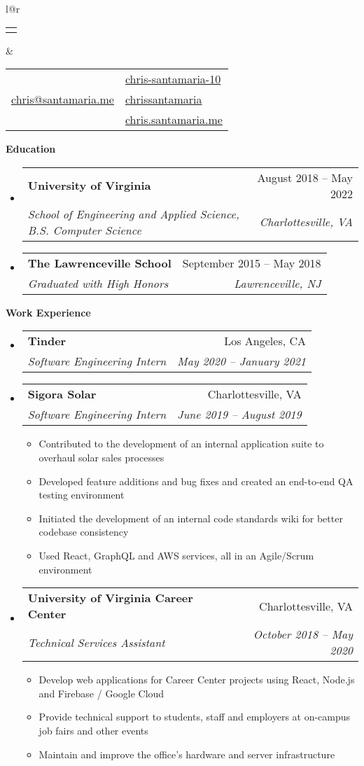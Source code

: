 \documentclass[letterpaper,12pt]{article}[leftmargin=*]
\makeatletter
\def \fullname {Chris Santamaria}
\def \linkedinicon {\faLinkedinSquare}
\def \linkedinlink {https://www.linkedin.com/in/chris-santamaria-10}
\def \linkedintext {chris-santamaria-10}
\def \phoneicon {\faPhone}
\def \phonetext {(813) 545-5164}
\def \emailicon {\faEnvelope}
\def \emaillink {mailto:chris@santamaria.me}
\def \emailtext {chris@santamaria.me}
\def \locationicon {\faMapMarker}
\def \locationtext {Saint Petersburg, FL}
\def \githubicon {\faGithub}
\def \githublink {https://github.com/chrissantamaria}
\def \githubtext {chrissantamaria}
\def \websiteicon {\faGlobe}
\def \websitelink {https://chris.santamaria.me}
\def \websitetext {chris.santamaria.me}
\def \headertype {\doublecol} %
\def \entryspacing {-0pt}
\def \linkedin {\linkedinicon \hspace{3pt}\href{\linkedinlink}{\linkedintext}}
\def \phone {\phoneicon \hspace{3pt}{ \phonetext}}
\def \email {\emailicon \hspace{4pt}\href{\emaillink}{\emailtext}}
\def \location {\hspace{0pt} \locationicon \hspace{2pt}{ \locationtext}}
\def \github {\githubicon \hspace{3pt}\href{\githublink}{\githubtext}}
\def \website {\websiteicon \hspace{3pt}\href{\websitelink}{\websitetext}}
\renewcommand{\section}[2]{\vspace{5pt}
  \colorbox{secondary}{\color{white}\raggedbottom\normalsize\textbf{{#1}{\hspace{7pt}#2}}}
}
\newcommand{\resumeEntryStart}{\begin{itemize}[leftmargin=2.5mm]}
\newcommand{\resumeEntryEnd}{\end{itemize}\vspace{\entryspacing}}
\newcommand{\resumeItemListStart}{\begin{itemize}[leftmargin=4.5mm]}
\newcommand{\resumeItemListEnd}{\end{itemize}}
\newcommand{\resumeItem}[1]{
  \item\small{
    {#1 \vspace{-2pt}}
  }
}
\newcommand{\resumeEntryTSDL}[4]{
  \vspace{-1pt}\item[]
    \begin{tabular*}{0.97\textwidth}{l@{\extracolsep{\fill}}r}
      \textbf{\color{primary}#1} & {\firabook\color{accent}\small#2} \\
      \textit{\color{accent}\small#3} & \textit{\color{accent}\small#4} \\
    \end{tabular*}\vspace{-7pt}
}
\newcommand{\doublecol}[6]{
  \begin{tabular*}{\textwidth}{l@{\extracolsep{\fill}}r}
    {
      \begin{tabular}[c]{l}
        \fontsize{35}{45}\selectfont{\color{primary}{{\textbf{\fullname}}}}
      \end{tabular}
    } & {
      \begin{tabular}[c]{l@{\hspace{1.5em}}l}
        {\small#4} & {\small#1} \\
        {\small#5} & {\small#2} \\
        {\small#6} & {\small#3}
      \end{tabular}
    }
  \end{tabular*}
}
\newcommand{\singlecol}[6]{
  \begin{tabular*}{\textwidth}{l@{\extracolsep{\fill}}r}
    {
      \begin{tabular}[b]{l}
        \fontsize{35}{45}\selectfont{\color{primary}{{\textbf{\fullname}}}} \\
        {\textit{\subtitle}} %
      \end{tabular}
    } & {
      \begin{tabular}[c]{l}
        {\small#1} \\
        {\small#2} \\
        {\small#3} \\
        {\small#4} \\
        {\small#5} \\
        {\small#6}
      \end{tabular}
    }
  \end{tabular*}
}
\makeatother
\begin{document}


\headertype{\linkedin}{\github}{\website}{\phone}{\email}{\location} %
\vspace{0pt} %

\section{\faGraduationCap}{Education}

  \resumeEntryStart
    \resumeEntryTSDL
      {University of Virginia}{August 2018 -- May 2022}
      {School of Engineering and Applied Science, B.S. Computer Science}{Charlottesville, VA}
  \resumeEntryEnd
  \resumeEntryStart
  \resumeEntryTSDL
    {The Lawrenceville School}{September 2015 -- May 2018}
    {Graduated with High Honors}{Lawrenceville, NJ}
  \resumeEntryEnd

\section{\faCode}{Work Experience}

  \resumeEntryStart
    \resumeEntryTSDL
      {Tinder}{Los Angeles, CA}
      {Software Engineering Intern}{May 2020 -- January 2021}
  \resumeEntryEnd

  \resumeEntryStart
    \resumeEntryTSDL
      {Sigora Solar}{Charlottesville, VA}
      {Software Engineering Intern}{June 2019 -- August 2019}
    \resumeItemListStart
      \resumeItem {Contributed to the development of an internal application suite to overhaul solar sales processes}
      \resumeItem {Developed feature additions and bug fixes and created an end-to-end QA testing environment}
      \resumeItem {Initiated the development of an internal code standards wiki for better codebase consistency}
      \resumeItem {Used React, GraphQL and AWS services, all in an Agile/Scrum environment}
    \resumeItemListEnd
  \resumeEntryEnd

  \resumeEntryStart
    \resumeEntryTSDL
      {University of Virginia Career Center}{Charlottesville, VA}
      {Technical Services Assistant}{October 2018 -- May 2020}
    \resumeItemListStart
      \resumeItem {Develop web applications for Career Center projects using React, Node.js and Firebase / Google Cloud}
      \resumeItem {Provide technical support to students, staff and employers at on-campus job fairs and other events}
      \resumeItem {Maintain and improve the office’s hardware and server infrastructure}
    \resumeItemListEnd
  \resumeEntryEnd
\end{document}
